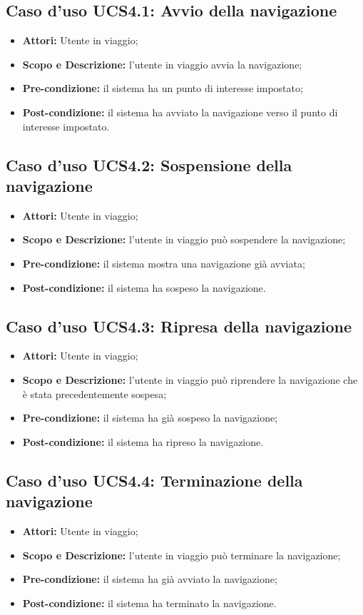 \subsection{Caso d'uso UCS4.1: Avvio della navigazione}
\begin{itemize}
\item \textbf{Attori:} Utente in viaggio;
\item \textbf{Scopo e Descrizione:} l'utente in viaggio avvia la navigazione;
\item \textbf{Pre-condizione:} il sistema ha un punto di interesse impostato;
\item \textbf{Post-condizione:} il sistema ha avviato la navigazione verso il punto di interesse impostato.
\end{itemize}

\subsection{Caso d'uso UCS4.2: Sospensione della navigazione}
\begin{itemize}
\item \textbf{Attori:} Utente in viaggio;
\item \textbf{Scopo e Descrizione:} l'utente in viaggio può sospendere la navigazione;
\item \textbf{Pre-condizione:} il sistema mostra una navigazione già avviata;
\item \textbf{Post-condizione:} il sistema ha sospeso la navigazione.
\end{itemize}

\subsection{Caso d'uso UCS4.3: Ripresa della navigazione}
\begin{itemize}
\item \textbf{Attori:} Utente in viaggio;
\item \textbf{Scopo e Descrizione:} l'utente in viaggio può riprendere la navigazione che è stata precedentemente sospesa;
\item \textbf{Pre-condizione:} il sistema ha già sospeso la navigazione;
\item \textbf{Post-condizione:} il sistema ha ripreso la navigazione.
\end{itemize}


\subsection{Caso d'uso UCS4.4: Terminazione della navigazione}
\begin{itemize}
\item \textbf{Attori:} Utente in viaggio;
\item \textbf{Scopo e Descrizione:} l'utente in viaggio può terminare la navigazione;
\item \textbf{Pre-condizione:} il sistema ha già avviato la navigazione;
\item \textbf{Post-condizione:} il sistema ha terminato la navigazione.
\end{itemize}

